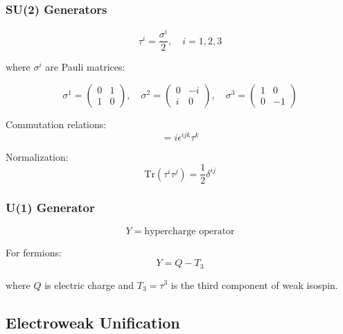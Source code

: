 \subsubsection{SU(2) Generators}

\begin{equation}
\tau^i = \frac{\sigma^i}{2}, \quad i = 1, 2, 3
\end{equation}

where $\sigma^i$ are Pauli matrices:

\begin{equation}
\sigma^1 = \begin{pmatrix} 0 & 1 \\ 1 & 0 \end{pmatrix}, \quad
\sigma^2 = \begin{pmatrix} 0 & -i \\ i & 0 \end{pmatrix}, \quad
\sigma^3 = \begin{pmatrix} 1 & 0 \\ 0 & -1 \end{pmatrix}
\end{equation}

Commutation relations:
\begin{equation}
[\tau^i, \tau^j] = i\epsilon^{ijk}\tau^k
\end{equation}

Normalization:
\begin{equation}
\text{Tr}(\tau^i \tau^j) = \frac{1}{2}\delta^{ij}
\end{equation}

\subsubsection{U(1) Generator}

\begin{equation}
Y = \text{hypercharge operator}
\end{equation}

For fermions:
\begin{equation}
Y = Q - T_3
\end{equation}

where $Q$ is electric charge and $T_3 = \tau^3$ is the third component of weak isospin.

\subsection{Electroweak Unification}

